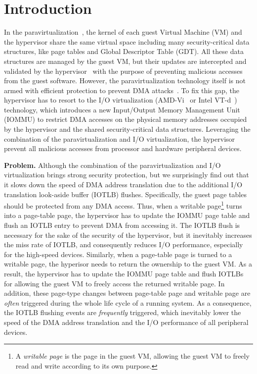\section{Introduction} \label{sec:intro}
In the paravirtualization~\cite{XEN-SOSP03,denali-paravirtualization}, the kernel of each guest Virtual Machine (VM) and the hypervisor share the same virtual space including many security-critical data structures, like page tables and Global Descriptor Table (GDT). All these data structures are managed by the guest VM, but their updates are intercepted and validated by the hypervisor~\cite{XEN-SOSP03} with the purpose of preventing malicious accesses from the guest software.
However, the paravirtualization technology itself is not armed with efficient protection to prevent DMA attacks~\cite{disaggregation}.
To fix this gap, the hypervisor has to resort to the I/O virtualization (AMD-Vi~\cite{amdvt} or Intel VT-d~\cite{intelvt}) technology, which introduces a new Input/Output Memory Management Unit (IOMMU) to restrict DMA accesses on the physical memory addresses occupied by the hypervisor and the shared security-critical data structures.
Leveraging the combination of the paravirtualization and I/O virtualization, the hypervisor prevent all malicious accesses from processor and hardware peripheral devices.

\textbf{Problem.} Although the combination of the paravirtualization and I/O virtualization brings strong security protection, but we surprisingly find out that it slows down the speed of DMA address translation due to the additional I/O translation look-aside buffer (IOTLB) flushes.
Specifically, the guest page tables should be protected from any DMA access.
Thus, when a writable page\footnote{A \emph{writable page} is the page in the guest VM, allowing the guest VM to freely read and write according to its own purpose.} turns into a page-table page, the hypervisor has to update the IOMMU page table and flush an IOTLB entry to prevent DMA from accessing it.
The IOTLB flush is necessary for the sake of the security of the hypervisor, but it inevitably increases the miss rate of IOTLB, and consequently reduces I/O performance, especially for the high-speed devices.
Similarly, when a page-table page is turned to a writable page, the hyperisor needs to return the ownership to the guest VM.
As a result, the hypervisor has to update the IOMMU page table and flush IOTLBs for allowing the guest VM to freely access the returned writable page.
In addition, these page-type changes between page-table page and writable page are \emph{often} triggered during the whole life cycle of a running system.
As a consequence, the IOTLB flushing events are \emph{frequently} triggered, which inevitably lower the speed of the DMA address translation and the I/O performance of all peripheral devices.


